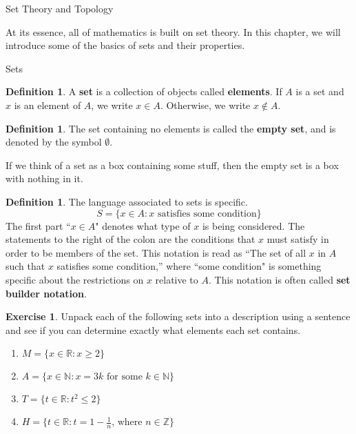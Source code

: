 \documentclass[11pt]{article}
\theoremstyle{definition}
\newtheorem{definition}[theorem]{Definition}
\newtheorem{exercise}[theorem]{Exercise}
\begin{document}
\addtocounter{section}{1}

\begin{section}{Set Theory and Topology}

At its essence, all of mathematics is built on set theory.  In this chapter, we will introduce some of the basics of sets and their properties.

\begin{subsection}{Sets} 

\begin{definition}
A \textbf{set} is a collection of objects called \textbf{elements}. If $A$ is a set and $x$ is an element of $A$, we write
$x\in A$. Otherwise, we write $x\notin A$.
\end{definition}

\begin{definition}
The set containing no elements is called the \textbf{empty set}, and is denoted by the symbol $\emptyset$.
\end{definition}

If we think of a set as a box containing some stuff, then the empty set is a box with nothing in it.

\begin{definition} 
The language associated to sets is specific.  
\[
S=\{x \in A: x \mbox{ satisfies some condition}\}
\]
The first part ``$x \in A$" denotes what type of $x$ is being considered.  The statements to the right of the colon are the conditions that $x$ must satisfy in order to be members of the set.  This notation is read as ``The set of all $x$ in $A$ such that $x$ satisfies some condition,'' where ``some condition" is something specific about the restrictions on $x$ relative to $A$.  This notation is often called \textbf{set builder notation}.
\end{definition}

\begin{exercise}
Unpack each of the following sets into a description using a sentence and see if you can determine exactly what elements each set contains.
\begin{enumerate}
\item $M=\{x \in \mathbb{R} :  x \geq 2 \}$
\item $A=\{x \in \mathbb{N} : x = 3k \mbox{ for some } k\in \mathbb{N} \}$
\item $T=\{t \in \mathbb{R} : t^2 \leq 2 \}$
\item $H=\{t \in \mathbb{R} : t = 1 - \frac{1}{n} \mbox{, where } n \in \mathbb{Z} \}$
\end{enumerate}
\end{exercise}


\end{subsection}
\end{section}
\end{document}
